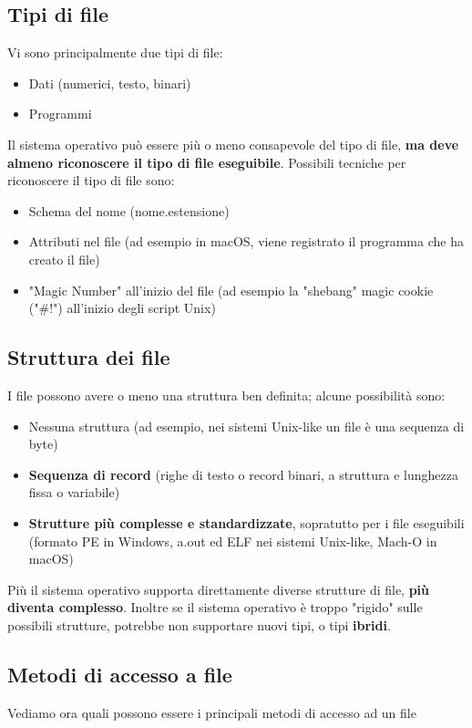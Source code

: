 \documentclass[12pt]{article}
\begin{document}
\subsection{Tipi di file}
Vi sono principalmente due tipi di file:
\begin{itemize}
    \item Dati (numerici, testo, binari)
    \item Programmi
\end{itemize}
Il sistema operativo può essere più o meno consapevole del tipo di file, \textbf{ma deve almeno riconoscere il tipo di file eseguibile}.
Possibili tecniche per riconoscere il tipo di file sono:
\begin{itemize}
    \item Schema del nome (nome.estensione)
    \item Attributi nel file (ad esempio in macOS, viene registrato il programma che ha creato il file)
    \item "Magic Number" all'inizio del file (ad esempio la "shebang" magic cookie ("\#!") all'inizio degli script Unix)
\end{itemize}
\subsection{Struttura dei file}
I file possono avere o meno una struttura ben definita; alcune possibilità sono:
\begin{itemize}
    \item Nessuna struttura (ad esempio, nei sistemi Unix-like un file è una sequenza di byte)
    \item \textbf{Sequenza di record} (righe di testo o record binari, a struttura e lunghezza fissa o variabile)
    \item \textbf{Strutture più complesse e standardizzate}, sopratutto per i file eseguibili (formato PE in Windows, a.out ed ELF nei sistemi Unix-like, Mach-O in macOS)
\end{itemize}
Più il sistema operativo supporta direttamente diverse strutture di file, \textbf{più diventa complesso}.
Inoltre se il sistema operativo è troppo "rigido" sulle possibili strutture, potrebbe non supportare nuovi tipi, o tipi \textbf{ibridi}.
\subsection{Metodi di accesso a file}
Vediamo ora quali possono essere i principali metodi di accesso ad un file
\end{document}
